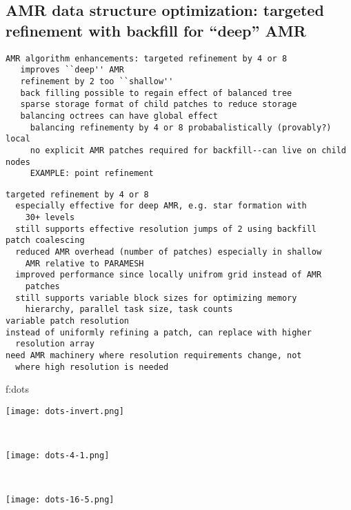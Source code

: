 \documentclass[14pt,letter]{article}
\begin{document}
\subsection{AMR data structure optimization: targeted refinement with backfill for ``deep'' AMR}

\begin{verbatim}
AMR algorithm enhancements: targeted refinement by 4 or 8
   improves ``deep'' AMR
   refinement by 2 too ``shallow''
   back filling possible to regain effect of balanced tree
   sparse storage format of child patches to reduce storage 
   balancing octrees can have global effect
     balancing refinementy by 4 or 8 probabalistically (provably?) local
     no explicit AMR patches required for backfill--can live on child nodes 
     EXAMPLE: point refinement
\end{verbatim}

\begin{verbatim}
targeted refinement by 4 or 8
  especially effective for deep AMR, e.g. star formation with
    30+ levels
  still supports effective resolution jumps of 2 using backfill
patch coalescing
  reduced AMR overhead (number of patches) especially in shallow
    AMR relative to PARAMESH
  improved performance since locally unifrom grid instead of AMR
    patches
  still supports variable block sizes for optimizing memory
    hierarchy, parallel task size, task counts
variable patch resolution
instead of uniformly refining a patch, can replace with higher
  resolution array
need AMR machinery where resolution requirements change, not
  where high resolution is needed
\end{verbatim}

{f:dots}{
\begin{minipage}{7.0in}
\begin{minipage}{2.2in}
\texttt{[image: dots-invert.png]}
\end{minipage} \ 
\begin{minipage}{2.2in}
\texttt{[image: dots-4-1.png]}
\end{minipage} \ 
\begin{minipage}{2.2in}
\texttt{[image: dots-16-5.png]}
\end{minipage}
\end{minipage}}
\end{document}
